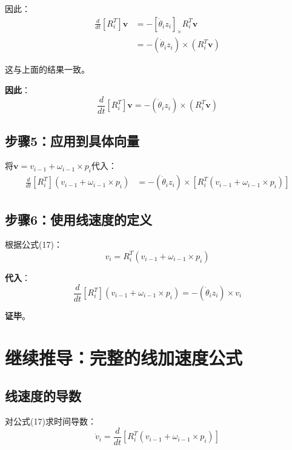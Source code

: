 \documentclass[12pt,a4paper]{article}
\begin{document}
因此：
\begin{align}
\frac{d}{dt}[R_i^T] \mathbf{v} &= -[\dot{\theta}_i z_i]_{\times} R_i^T \mathbf{v} \\
&= -(\dot{\theta}_i z_i) \times (R_i^T \mathbf{v})
\end{align}

这与上面的结果一致。

\textbf{因此}：
\begin{equation}
\frac{d}{dt}[R_i^T] \mathbf{v} = -(\dot{\theta}_i z_i) \times (R_i^T \mathbf{v})
\end{equation}

\subsection{步骤5：应用到具体向量}

将$\mathbf{v} = v_{i-1} + \omega_{i-1} \times p_i$代入：
\begin{align}
\frac{d}{dt}[R_i^T](v_{i-1} + \omega_{i-1} \times p_i) &= -(\dot{\theta}_i z_i) \times [R_i^T (v_{i-1} + \omega_{i-1} \times p_i)]
\end{align}

\subsection{步骤6：使用线速度的定义}

根据公式(17)：
\begin{equation}
v_i = R_i^T (v_{i-1} + \omega_{i-1} \times p_i)
\end{equation}

\textbf{代入}：
\begin{equation}
\frac{d}{dt}[R_i^T](v_{i-1} + \omega_{i-1} \times p_i) = -(\dot{\theta}_i z_i) \times v_i
\end{equation}

\textbf{证毕}。

\section{继续推导：完整的线加速度公式}

\subsection{线速度的导数}

对公式(17)求时间导数：
\begin{equation}
\dot{v}_i = \frac{d}{dt}[R_i^T (v_{i-1} + \omega_{i-1} \times p_i)]
\end{equation}
\end{document}
